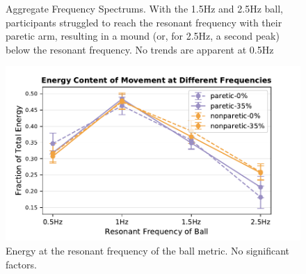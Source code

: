 \documentclass{article}
\begin{document}
\begin{figure}[!ht]
     \centering
     \hfill
     \hfill
	\caption{Aggregate Frequency Spectrums. With the 1.5Hz and 2.5Hz ball, participants struggled to reach the resonant frequency with their paretic arm, resulting in a mound (or, for 2.5Hz, a second peak) below the resonant frequency. No trends are apparent at 0.5Hz}
\end{figure}

\begin{figure}[!ht]
     \centering
     \includegraphics[width=0.49\linewidth]{Plots/e_at_res_raw_all.pdf}
	\caption{Energy at the resonant frequency of the ball metric. No significant factors.}
\end{figure}
\end{document}
